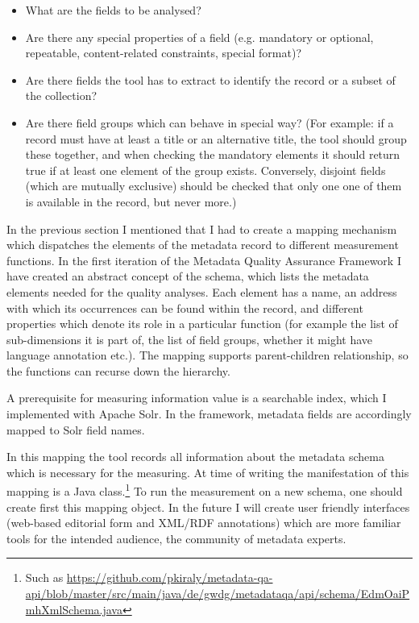 \begin{itemize}
 \setlength{\parskip}{0pt}
 \setlength{\itemsep}{0pt plus 1pt}
\item What are the fields to be analysed?
\item Are there any special properties of a field (e.g. mandatory or optional, repeatable, content-related constraints, special format)?
\item Are there fields the tool has to extract to identify the record or a subset of the collection?
\item Are there field groups which can behave in special way? (For example: if a record must have at least a title or an alternative title, the tool should group these together, and when checking the mandatory elements it should return true if at least one element of the group exists. Conversely, disjoint fields (which are mutually exclusive) should be checked that only one one of them is available in the record, but never more.)
\end{itemize}

In the previous section I mentioned that I had to create a mapping mechanism which dispatches the elements of the metadata record to different measurement functions. In the first iteration of the Metadata Quality Assurance Framework I have created an abstract concept of the schema, which lists the metadata elements needed for the quality analyses. Each element has a name, an address with which its occurrences can be found within the record, and different properties which denote its role in a particular function (for example the list of sub-dimensions it is part of, the list of field groups, whether it might have language annotation etc.). The mapping supports parent-children relationship, so the functions can recurse down the hierarchy.

A prerequisite for measuring information value is a searchable index, which I implemented with Apache Solr. In the framework, metadata fields are accordingly mapped to Solr field names.

In this mapping the tool records all information about the metadata schema which is necessary for the measuring. At time of writing the manifestation of this mapping is a Java class.\footnote{Such as \url{https://github.com/pkiraly/metadata-qa-api/blob/master/src/main/java/de/gwdg/metadataqa/api/schema/EdmOaiPmhXmlSchema.java}} To run the measurement on a new schema, one should create first this mapping object. In the future I will create user friendly interfaces (web-based editorial form and XML/RDF annotations) which are more familiar tools for the intended audience, the community of metadata experts.

